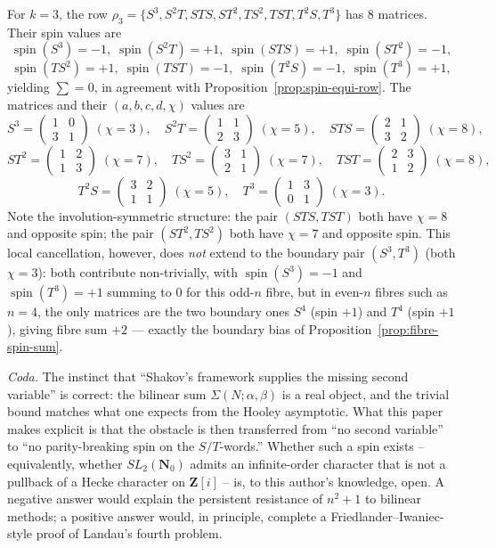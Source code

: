 \documentclass[11pt]{article}
\theoremstyle{definition}
\newcommand{\Nz}{\mathbf{N}_0}
\newcommand{\Z}{\mathbf{Z}}
\newcommand{\SLNz}{SL_2(\Nz)}
\DeclareMathOperator{\spin}{spin}
\begin{document}
For $k=3$, the row $\rho_{3}=\{S^{3},S^{2}T,STS,ST^{2},TS^{2},TST,T^{2}S,T^{3}\}$
has $8$ matrices. Their spin values are
\[
\spin(S^{3})=-1,\;\spin(S^{2}T)=+1,\;\spin(STS)=+1,\;\spin(ST^{2})=-1,
\]
\[
\spin(TS^{2})=+1,\;\spin(TST)=-1,\;\spin(T^{2}S)=-1,\;\spin(T^{3})=+1,
\]
yielding $\sum=0$, in agreement with Proposition~\ref{prop:spin-equi-row}.
The matrices and their $(a,b,c,d,\chi)$ values are
\[
S^{3}=\begin{pmatrix}1&0\\3&1\end{pmatrix}\;(\chi=3),\quad
S^{2}T=\begin{pmatrix}1&1\\2&3\end{pmatrix}\;(\chi=5),\quad
STS=\begin{pmatrix}2&1\\3&2\end{pmatrix}\;(\chi=8),
\]
\[
ST^{2}=\begin{pmatrix}1&2\\1&3\end{pmatrix}\;(\chi=7),\quad
TS^{2}=\begin{pmatrix}3&1\\2&1\end{pmatrix}\;(\chi=7),\quad
TST=\begin{pmatrix}2&3\\1&2\end{pmatrix}\;(\chi=8),
\]
\[
T^{2}S=\begin{pmatrix}3&2\\1&1\end{pmatrix}\;(\chi=5),\quad
T^{3}=\begin{pmatrix}1&3\\0&1\end{pmatrix}\;(\chi=3).
\]
Note the involution-symmetric structure: the pair $(STS,TST)$ both have
$\chi=8$ and opposite spin; the pair $(ST^{2},TS^{2})$ both have
$\chi=7$ and opposite spin. This local cancellation, however, does
\emph{not} extend to the boundary pair $(S^{3},T^{3})$ (both
$\chi=3$): both contribute non-trivially, with $\spin(S^{3})=-1$ and
$\spin(T^{3})=+1$ summing to $0$ for this odd-$n$ fibre, but in even-$n$
fibres such as $n=4$, the only matrices are the two boundary ones
$S^{4}$ (spin $+1$) and $T^{4}$ (spin $+1$), giving fibre sum $+2$ ---
exactly the boundary bias of Proposition~\ref{prop:fibre-spin-sum}.

\medskip

\noindent\textit{Coda.} The instinct that ``Shakov's framework supplies
the missing second variable'' is correct: the bilinear sum
$\Sigma(N;\alpha,\beta)$ is a real object, and the trivial bound matches
what one expects from the Hooley asymptotic. What this paper makes
explicit is that the obstacle is then transferred from ``no second
variable'' to ``no parity-breaking spin on the $S/T$-words.'' Whether
such a spin exists -- equivalently, whether $\SLNz$ admits an
infinite-order character that is not a pullback of a Hecke character on
$\Z[i]$ -- is, to this author's knowledge, open. A negative answer would
explain the persistent resistance of $n^{2}+1$ to bilinear methods; a
positive answer would, in principle, complete a Friedlander--Iwaniec-style
proof of Landau's fourth problem.
\end{document}
